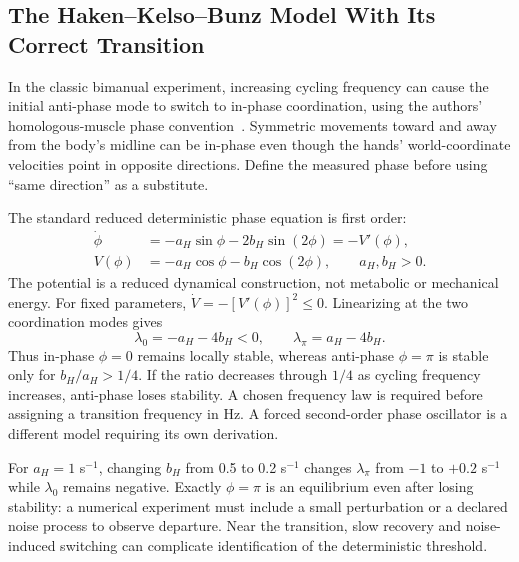 \subsection{The Haken--Kelso--Bunz Model With Its Correct Transition}
\label{sec:bio-hkb}

In the classic bimanual experiment, increasing cycling frequency can cause the
initial anti-phase mode to switch to in-phase coordination, using the authors'
homologous-muscle phase convention~\cite{HakenKelsoBunz1985}. Symmetric movements
toward and away from the body's midline can be in-phase even though the hands'
world-coordinate velocities point in opposite directions. Define the measured
phase before using ``same direction'' as a substitute.

The standard reduced deterministic phase equation is first order:
\begin{align}
\dot\phi&=-a_H\sin\phi-2b_H\sin(2\phi)=-V'(\phi),
\label{eq:ch8:hkb-model}\\
V(\phi)&=-a_H\cos\phi-b_H\cos(2\phi),\qquad a_H,b_H>0.
\end{align}
The potential is a reduced dynamical construction, not metabolic or mechanical
energy. For fixed parameters, $\dot V=-[V'(\phi)]^2\leq0$. Linearizing at the
two coordination modes gives
\begin{equation}
\lambda_0=-a_H-4b_H<0,\qquad
\lambda_\pi=a_H-4b_H.
\label{eq:ch8:hkb-stability}
\end{equation}
Thus in-phase $\phi=0$ remains locally stable, whereas anti-phase $\phi=\pi$
is stable only for $b_H/a_H>1/4$. If the ratio decreases through $1/4$ as
cycling frequency increases, anti-phase loses stability. A chosen frequency
law is required before assigning a transition frequency in Hz. A forced
second-order phase oscillator is a different model requiring its own derivation.

For $a_H=1$ s$^{-1}$, changing $b_H$ from 0.5 to 0.2 s$^{-1}$ changes
$\lambda_\pi$ from $-1$ to $+0.2$ s$^{-1}$ while $\lambda_0$ remains negative.
Exactly $\phi=\pi$ is an equilibrium even after losing stability: a numerical
experiment must include a small perturbation or a declared noise process to
observe departure. Near the transition, slow recovery and noise-induced switching
can complicate identification of the deterministic threshold.

